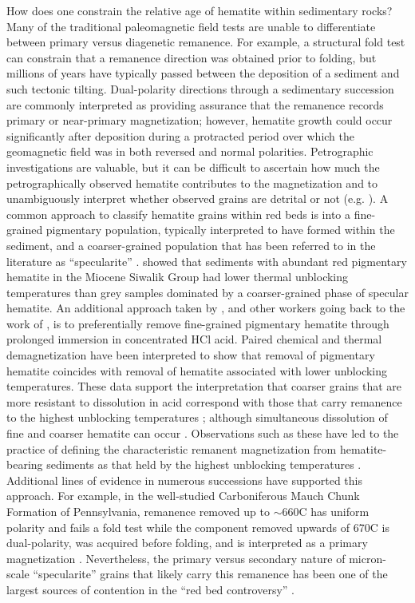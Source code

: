 \documentclass[draft]{agujournal2018}
\begin{document}
How does one constrain the relative age of hematite within sedimentary rocks? Many of the traditional paleomagnetic field tests are unable to differentiate between primary versus diagenetic remanence. For example, a structural fold test can constrain that a remanence direction was obtained prior to folding, but millions of years have typically passed between the deposition of a sediment and such tectonic tilting. Dual-polarity directions through a sedimentary succession are commonly interpreted as providing assurance that the remanence records primary or near-primary magnetization; however, hematite growth could occur significantly after deposition during a protracted period over which the geomagnetic field was in both reversed and normal polarities. Petrographic investigations are valuable, but it can be difficult to ascertain how much the petrographically observed hematite contributes to the magnetization and to unambiguously interpret whether observed grains are detrital or not (e.g. \citealp{Elmore1982a}). A common approach to classify hematite grains within red beds is into a fine-grained pigmentary population, typically interpreted to have formed within the sediment, and a coarser-grained population that has been referred to in the literature as ``specularite'' \citep{Butler1992a, Van-Der-Voo2012a}. \citet{Tauxe1980a} showed that sediments with abundant red pigmentary hematite in the Miocene Siwalik Group had lower thermal unblocking temperatures than grey samples dominated by a coarser-grained phase of specular hematite. An additional approach taken by \citet{Tauxe1980a}, and other workers going back to the work of \citet{Collinson1965a}, is to preferentially remove fine-grained pigmentary hematite through prolonged immersion in concentrated HCl acid. Paired chemical and thermal demagnetization have been interpreted to show that removal of pigmentary hematite coincides with removal of hematite associated with lower unblocking temperatures. These data support the interpretation that coarser grains that are more resistant to dissolution in acid correspond with those that carry remanence to the highest unblocking temperatures \citep{Tauxe1980a,Bilardello2010c}; although simultaneous dissolution of fine and coarser hematite can occur \citep{Jiang2017a}. Observations such as these have led to the practice of defining the characteristic remanent magnetization from hematite-bearing sediments as that held by the highest unblocking temperatures \citep{Van-Der-Voo2012a}. Additional lines of evidence in numerous successions have supported this approach. For example, in the well-studied Carboniferous Mauch Chunk Formation of Pennsylvania, remanence removed up to $\sim$660\textdegree C has uniform polarity and fails a fold test while the component removed upwards of 670\textdegree C is dual-polarity, was acquired before folding, and is interpreted as a primary magnetization \citep{Kent1985b, DiVenere1991a}. Nevertheless, the primary versus secondary nature of micron-scale ``specularite'' grains that likely carry this remanence has been one of the largest sources of contention in the ``red bed controversy'' \citep{Van-Houten1968a, Tauxe1980a, Butler1992a, Van-Der-Voo2012a}.
\end{document}

